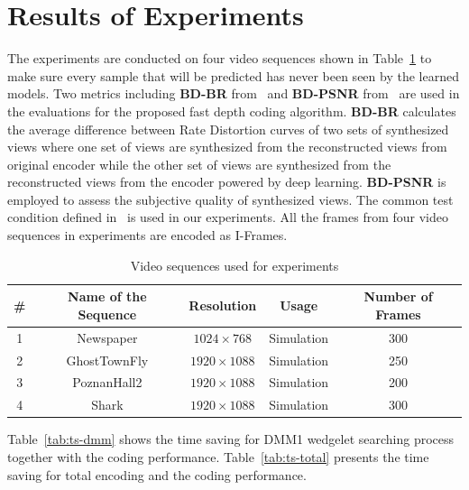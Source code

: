 \section{Results of Experiments}\label{sec:simu-results}
The experiments are conducted on four video sequences shown in
Table~\ref{tab:data-for-experiments} 
to make sure every sample
that will be predicted has never been seen by the learned models.
Two metrics including \textbf{BD-BR} from~\parencite{RN234} and \textbf{BD-PSNR}
from~\parencite{RN235}
are used in the evaluations for the proposed fast 
depth coding algorithm.
\textbf{BD-BR} calculates the average difference between
Rate Distortion curves of two sets of synthesized views
where one set of views are synthesized from 
the reconstructed views from original encoder while 
the other set of views are synthesized from 
the reconstructed views from the encoder powered by
deep learning.
\textbf{BD-PSNR} is employed to assess the subjective 
quality of synthesized views.
The common test condition defined
in~\parencite{common-test-condition}
is used in our experiments.
All the frames from four video sequences in experiments 
are encoded as I-Frames.
\begin{table}[!htbp]
    \caption{Video sequences used for experiments}
    \bigskip\label{tab:data-for-experiments}
    \centering
    \begin{tabular}{c c c c c}
        \toprule
        \# & Name of the Sequence & Resolution & Usage & Number of Frames\\
        \midrule
        1 & Newspaper & \(1024\times768\) & Simulation & 300\\
        2 & GhostTownFly & \(1920\times1088\) & Simulation & 250\\
        3 & PoznanHall2 & \(1920\times1088\) & Simulation & 200\\
        4 & Shark & \(1920\times1088\) & Simulation & 300\\
        \bottomrule
    \end{tabular}
\end{table}

Table~\ref{tab:ts-dmm}
shows the time saving for DMM1 wedgelet searching process together 
with the coding performance.
Table~\ref{tab:ts-total}
presents the time saving for total encoding and the coding performance.


